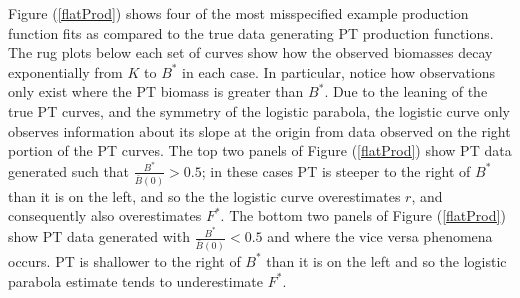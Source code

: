 %
Figure (\ref{flatProd}) shows four of the most misspecified example
production function fits as compared to the true data generating PT production
functions. The rug plots below each set of curves show how the observed
biomasses decay exponentially from $K$ to $B^*$ in each case. In particular,
notice how observations only exist where the PT biomass is greater than $B^*$.
Due to the leaning of the true PT curves, and the symmetry of the logistic 
parabola, the logistic curve only observes information about its slope at the
origin from data observed on the right portion of the PT curves. 
The top two
panels of Figure (\ref{flatProd}) show PT data generated such
that $\frac{B^*}{\bar B(0)}>0.5$; in these cases PT is steeper to the right of
$B^*$ than it is on the left, and so the the logistic curve overestimates $r$,
and consequently also overestimates $F^*$. %
The bottom two panels of Figure (\ref{flatProd}) show PT data
generated with $\frac{B^*}{\bar B(0)}<0.5$ and where the vice versa phenomena
occurs. PT is shallower to the right of $B^*$ than it is on the left and so the
logistic parabola estimate tends to underestimate $F^*$.

